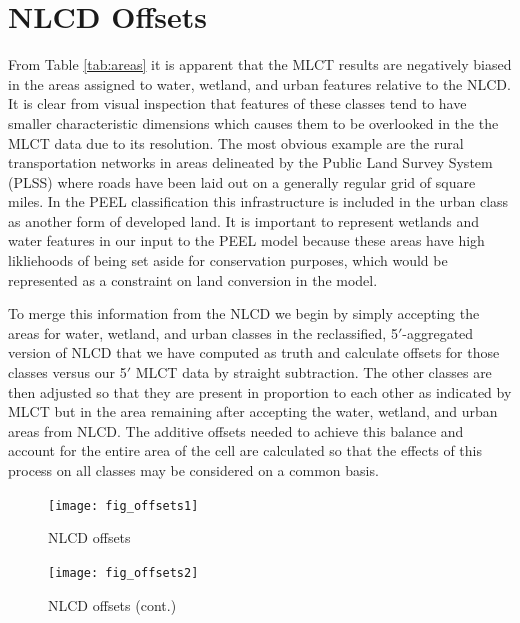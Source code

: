 \section{NLCD Offsets}
\label{sec:nlcd_offsets}


From Table \ref{tab:areas} it is apparent that the MLCT results are
negatively biased in the areas assigned to water, wetland, and urban
features relative to the NLCD.  It is clear from visual inspection
that features of these classes tend to have smaller characteristic
dimensions which causes them to be overlooked in the the MLCT data due
to its resolution.  The most obvious example are the rural
transportation networks in areas delineated by the Public Land Survey
System (PLSS) where roads have been laid out on a generally regular
grid of square miles.  In the PEEL classification this infrastructure
is included in the urban class as another form of developed land.  It
is important to represent wetlands and water features in our input to
the PEEL model because these areas have high likliehoods of being set
aside for conservation purposes, which would be represented as a
constraint on land conversion in the model.

To merge this information from the NLCD we begin by simply accepting
the areas for water, wetland, and urban classes in the reclassified,
5$'$-aggregated version of NLCD that we have computed as truth and
calculate offsets for those classes versus our 5$'$ MLCT data by
straight subtraction.  The other classes are then adjusted so that
they are present in proportion to each other as indicated by MLCT but
in the area remaining after accepting the water, wetland, and urban
areas from NLCD.  The additive offsets needed to achieve this balance
and account for the entire area of the cell are calculated so that the
effects of this process on all classes may be considered on a common
basis.


\begin{figure}[hpt]
  \begin{center} 


\texttt{[image: fig\_offsets1]}
  \end{center} 
  \caption{NLCD offsets}
  \label{fig:offsets1} 
\end{figure} 

\begin{figure}[hpt]
  \begin{center} 


\texttt{[image: fig\_offsets2]}
  \end{center} 
  \caption{NLCD offsets (cont.)}
  \label{fig:offsets2} 
\end{figure} 


